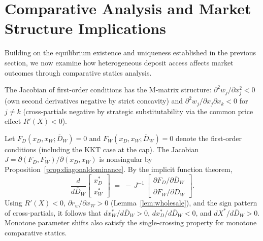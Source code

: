 \documentclass[12pt]{article}
\begin{document}
\section{Comparative Analysis and Market Structure Implications}
Building on the equilibrium existence and uniqueness established in the previous section, we now examine how heterogeneous deposit access affects market outcomes through comparative statics analysis.

\begin{lemma}\label{lem:crosspartials}
The Jacobian of first-order conditions has the M-matrix structure: $\partial^2 w_j/\partial x_j^2<0$ (own second derivatives negative by strict concavity) and $\partial^2 w_j/\partial x_j\partial x_k<0$ for $j\neq k$ (cross-partials negative by strategic substitutability via the common price effect $R'(X)<0$).
\end{lemma}

\begin{proposition}\label{prop:csDepositAccess}
Let $F_D(x_D,x_W;\overline D_W)=0$ and $F_W(x_D,x_W;\overline D_W)=0$ denote the first-order conditions (including the KKT case at the cap). The Jacobian $J=\partial(F_D,F_W)/\partial(x_D,x_W)$ is nonsingular by Proposition~\ref{prop:diagonaldominance}. By the implicit function theorem,
\begin{equation}
\frac{d}{d\overline D_W}\begin{bmatrix}x_D^*\\ x_W^*\end{bmatrix}
\;=\; -\,J^{-1}\,\begin{bmatrix}\partial F_D/\partial\overline D_W\\ \partial F_W/\partial\overline D_W\end{bmatrix}.
\end{equation}
Using $R'(X)<0$, $\partial r_w/\partial x_W>0$ (Lemma~\ref{lem:wholesale}), and the sign pattern of cross-partials, it follows that $dx_W^*/d\overline D_W>0$, $dx_D^*/d\overline D_W<0$, and $dX^*/d\overline D_W>0$. Monotone parameter shifts also satisfy the single-crossing property for monotone comparative statics.
\end{proposition}
\end{document}
